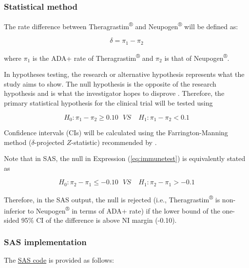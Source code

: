 \documentclass[]{article}
\begin{document}
\subsubsection{Statistical method}\label{statistical-method}

The rate difference between Theragrastim\textsuperscript{®} and
Neupogen\textsuperscript{®} will be defined as:

\begin{equation}\label{eq:adadiff}
\delta = \pi_1 -\pi_2
\end{equation}

where \(\pi_1\) is the ADA+ rate of Theragrastim\textsuperscript{®} and
\(\pi_2\) is that of Neupogen\textsuperscript{®}.

In hypotheses testing, the research or alternative hypothesis represents
what the study aims to show. The null hypothesis is the opposite of the
research hypothesis and is what the investigator hopes to disprove
\citep{walker2011understanding}. Therefore, the primary statistical
hypothesis for the clinical trial will be tested using

\begin{equation}\label{eq:immunetest}
H_0: \pi_1 - \pi_2 \geq 0.10~~~  VS~~~~~ H_1: \pi_1 - \pi_2 < 0.1
\end{equation}

Confidence intervals (CIs) will be calculated using the
Farrington-Manning method (\(\delta\)-projected \(Z\)-statistic)
recommended by \citet{chan1999test}.

Note that in SAS, the null in Expression (\ref{eq:immunetest}) is
equivalently stated as

\begin{equation}\label{eq:immunetest2}
H_0: \pi_2 - \pi_1 \leq -0.10~~~  VS~~~~~ H_1: \pi_2 - \pi_1 > -0.1
\end{equation}

Therefore, in the SAS output, the null is rejected (i.e.,
Theragrastim\textsuperscript{®} is non-inferior to
Neupogen\textsuperscript{®} in terms of ADA+ rate) if the lower bound of
the one-sided 95\% CI of the difference is above NI margin (-0.10).

\subsubsection{SAS implementation}\label{sas-implementation}

The
\href{https://support.sas.com/resources/papers/proceedings15/SAS1911-2015.pdf}{SAS
code} \citep{sasnoninf} is provided as follows:
\end{document}
